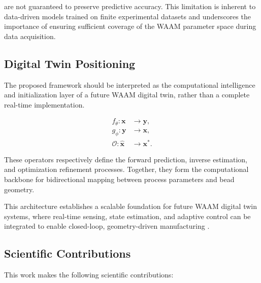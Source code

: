\documentclass[11pt]{article}
\begin{document}
are not guaranteed to preserve predictive accuracy. This limitation is inherent to data-driven models trained on finite experimental datasets and underscores the importance of ensuring sufficient coverage of the WAAM parameter space during data acquisition.

\subsection{Digital Twin Positioning}

The proposed framework should be interpreted as the computational intelligence and initialization layer of a future WAAM digital twin, rather than a complete real-time implementation.

\begin{tcolorbox}[colback=white,colframe=black,boxrule=0.5pt,arc=2pt]
\small
\begin{equation}
\begin{aligned}
f_{\theta}: \mathbf{x} &\rightarrow \mathbf{y}, \\
g_{\phi}: \mathbf{y} &\rightarrow \mathbf{x}, \\
\mathcal{O}: \hat{\mathbf{x}} &\rightarrow \mathbf{x}^{*}.
\end{aligned}
\end{equation}
\end{tcolorbox}

These operators respectively define the forward prediction, inverse estimation, and optimization refinement processes. Together, they form the computational backbone for bidirectional mapping between process parameters and bead geometry.

This architecture establishes a scalable foundation for future WAAM digital twin systems, where real-time sensing, state estimation, and adaptive control can be integrated to enable closed-loop, geometry-driven manufacturing \cite{Zhao2024DTWAAM}.


\subsection{Scientific Contributions}\label{contribution}

This work makes the following scientific contributions:
\end{document}
